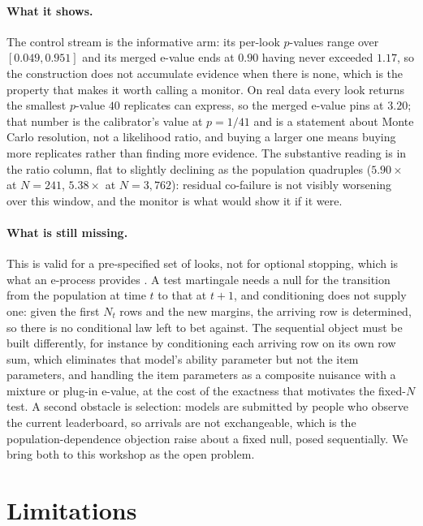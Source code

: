 \documentclass{article}
\begin{document}
\paragraph{What it shows.} The control stream is the informative arm: its per-look $p$-values range
over $[0.049,0.951]$ and its merged e-value ends at $0.90$ having never exceeded $1.17$, so the
construction does not accumulate evidence when there is none, which is the property that makes it
worth calling a monitor. On real data every look returns the smallest $p$-value $40$ replicates can
express, so the merged e-value pins at $3.20$; that number is the calibrator's value at $p=1/41$
and is a statement about Monte Carlo resolution, not a likelihood ratio, and buying a larger one
means buying more replicates rather than finding more evidence. The substantive reading is in the ratio
column, flat to slightly declining as the population quadruples ($5.90\times$ at $N=241$,
$5.38\times$ at $N=3{,}762$): residual co-failure is not visibly worsening over this window, and the
monitor is what would show it if it were.

\paragraph{What is still missing.} This is valid for a pre-specified set of looks, not for optional
stopping, which is what an e-process provides \citep{ramdas2023}. A test martingale needs a null for
the transition from the population at time $t$ to that at $t+1$, and conditioning does not supply
one: given the first $N_t$ rows and the new margins, the arriving row is determined, so there is no
conditional law left to bet against. The sequential object must be built differently, for instance
by conditioning each arriving row on its own row sum, which eliminates that model's ability
parameter but not the item parameters, and handling the item parameters as a composite nuisance
with a mixture or plug-in e-value, at the cost of the exactness that motivates the fixed-$N$ test. A
second obstacle is selection: models are submitted by people who observe the current leaderboard,
so arrivals are not exchangeable, which is the population-dependence objection \citet{jo2026} raise
about a fixed null, posed sequentially. We bring both to this workshop as the open problem.

\section{Limitations}
\end{document}
